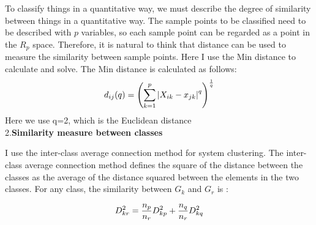 \documentclass[a4paper, 11pt,twoside=true]{scrartcl}
\begin{document}
\quad To classify things in a quantitative way, we must describe the degree of similarity between things in a quantitative way. The sample points to be classified need to be described with $p$ variables, so each sample point can be regarded as a point in the $R_p$ space. Therefore, it is natural to think that distance can be used to measure the similarity between sample points. Here I use the Min distance to calculate and solve. The Min distance is calculated as follows:
$$
\begin{aligned}
\centering
d_{ij}(q)=\left( \sum_{k=1}^p \left|X_{ik}-x_{jk}\right|^q \right)^{\frac{1}{q}}
\end{aligned}
$$
Here we use q=2, which is the Euclidean distance\\
2.\textbf{Similarity measure between classes}

\quad I use the inter-class average connection method for system clustering. The inter-class average connection method defines the square of the distance between the classes as the average of the distance squared between the elements in the two classes. For any class, the similarity between $G_k$ and $G_r$ is :

$$
\begin{aligned}
\centering
D_{kr}^2=\frac{n_p}{n_r}D_{kp}^2+\frac{n_q}{n_r}D_{kq}^2
\end{aligned}
$$
\end{document}
